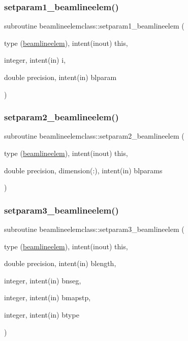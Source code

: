 \subsubsection{\texorpdfstring{setparam1\_beamlineelem()}{setparam1\_beamlineelem()}}
{\footnotesize\ttfamily subroutine beamlineelemclass\+::setparam1\+\_\+beamlineelem (\begin{DoxyParamCaption}\item[{type (\mbox{\hyperlink{namespacebeamlineelemclass_structbeamlineelemclass_1_1beamlineelem}{beamlineelem}}), intent(inout)}]{this,  }\item[{integer, intent(in)}]{i,  }\item[{double precision, intent(in)}]{blparam }\end{DoxyParamCaption})}

\mbox{\label{namespacebeamlineelemclass_a2ac6f016596ac46cf326e023cbb3f23b}} 
\subsubsection{\texorpdfstring{setparam2\_beamlineelem()}{setparam2\_beamlineelem()}}
{\footnotesize\ttfamily subroutine beamlineelemclass\+::setparam2\+\_\+beamlineelem (\begin{DoxyParamCaption}\item[{type (\mbox{\hyperlink{namespacebeamlineelemclass_structbeamlineelemclass_1_1beamlineelem}{beamlineelem}}), intent(inout)}]{this,  }\item[{double precision, dimension(\+:), intent(in)}]{blparams }\end{DoxyParamCaption})}

\mbox{\label{namespacebeamlineelemclass_a604cc75bca5926a1918df8c19454e41e}} 
\subsubsection{\texorpdfstring{setparam3\_beamlineelem()}{setparam3\_beamlineelem()}}
{\footnotesize\ttfamily subroutine beamlineelemclass\+::setparam3\+\_\+beamlineelem (\begin{DoxyParamCaption}\item[{type (\mbox{\hyperlink{namespacebeamlineelemclass_structbeamlineelemclass_1_1beamlineelem}{beamlineelem}}), intent(inout)}]{this,  }\item[{double precision, intent(in)}]{blength,  }\item[{integer, intent(in)}]{bnseg,  }\item[{integer, intent(in)}]{bmapstp,  }\item[{integer, intent(in)}]{btype }\end{DoxyParamCaption})}

